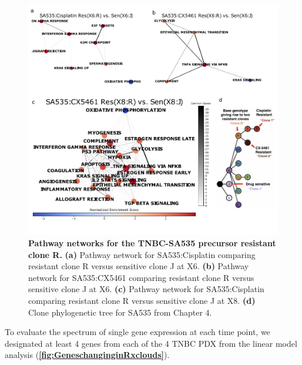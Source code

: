 \begin{figure}
\centering
 \includegraphics[width=\textwidth]{Figures/chap5/fig18_Rclone_pathways.pdf}
\caption[Pathway networks for the TNBC-SA535 precursor resistant clone.]
	{\small
	 \textbf{Pathway networks for the TNBC-SA535 precursor resistant clone R.} \textbf{(a)} Pathway network for SA535:Cisplatin comparing resistant clone R versus sensitive clone J at X6. \textbf{(b)} Pathway network for SA535:CX5461 comparing resistant clone R versus sensitive clone J at X6. \textbf{(c)} Pathway network for SA535:Cisplatin comparing resistant clone R versus sensitive clone J at X8. \textbf{(d)} Clone phylogenetic tree for SA535 from Chapter 4.
	 }

	\label{fig:Rpathways}
\end{figure}












To evaluate the spectrum of single gene expression at each time point, we designated at least 4 genes from each of the 4 TNBC PDX from the linear model analysis (\textbf{\autoref{fig:GeneschanginginRxclouds}}).



